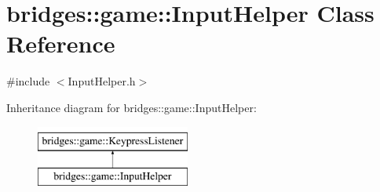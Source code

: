 \hypertarget{classbridges_1_1game_1_1_input_helper}{}\section{bridges\+:\+:game\+:\+:Input\+Helper Class Reference}
\label{classbridges_1_1game_1_1_input_helper}


{\ttfamily \#include $<$Input\+Helper.\+h$>$}

Inheritance diagram for bridges\+:\+:game\+:\+:Input\+Helper\+:\begin{figure}[H]
\begin{center}
\leavevmode
\includegraphics[height=2.000000cm]{classbridges_1_1game_1_1_input_helper}
\end{center}
\end{figure}


